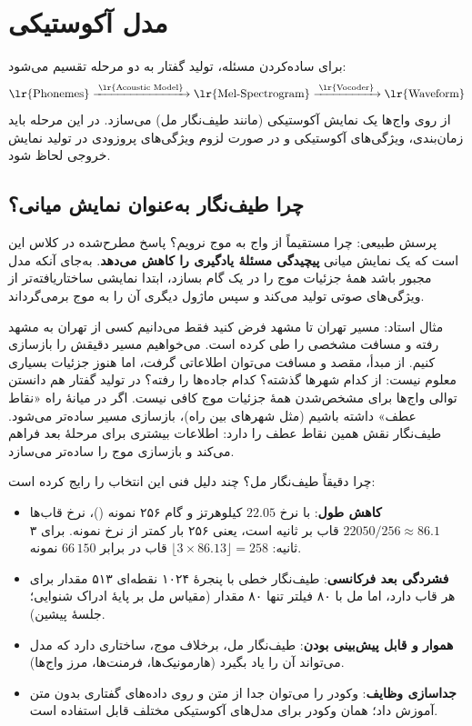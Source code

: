 \section{مدل آکوستیکی}

برای ساده‌کردن مسئله، تولید گفتار به دو مرحله تقسیم می‌شود:
\[
\text{\lr{Phonemes}} \xrightarrow{\;\text{\lr{Acoustic Model}}\;} \text{\lr{Mel-Spectrogram}} \xrightarrow{\;\text{\lr{Vocoder}}\;} \text{\lr{Waveform}}
\]
 از روی واج‌ها یک نمایش آکوستیکی (مانند طیف‌نگار مل) می‌سازد. در این مرحله باید زمان‌بندی، ویژگی‌های آکوستیکی و در صورت لزوم ویژگی‌های پروزودی در تولید نمایش خروجی لحاظ شود.

\subsection{چرا طیف‌نگار به‌عنوان نمایش میانی؟}
پرسش طبیعی: چرا مستقیماً از واج به موج نرویم؟ پاسخ مطرح‌شده در کلاس این است که یک نمایش میانی \textbf{پیچیدگی مسئلهٔ یادگیری را کاهش می‌دهد}. به‌جای آنکه مدل مجبور باشد همهٔ جزئیات موج را در یک گام بسازد، ابتدا نمایشی ساختاریافته‌تر از ویژگی‌های صوتی تولید می‌کند و سپس ماژول دیگری آن را به موج برمی‌گرداند.

\begin{exambox}{مثال استاد: مسیر تهران تا مشهد}
فرض کنید فقط می‌دانیم کسی از تهران به مشهد رفته و مسافت مشخصی را طی کرده است. می‌خواهیم مسیر دقیقش را بازسازی کنیم. از مبدأ، مقصد و مسافت می‌توان اطلاعاتی گرفت، اما هنوز جزئیات بسیاری معلوم نیست: از کدام شهرها گذشته؟ کدام جاده‌ها را رفته؟ در تولید گفتار هم دانستن توالی واج‌ها برای مشخص‌شدن همهٔ جزئیات موج کافی نیست. اگر در میانهٔ راه «نقاط عطف» داشته باشیم (مثل شهرهای بین راه)، بازسازی مسیر ساده‌تر می‌شود. طیف‌نگار نقش همین نقاط عطف را دارد: اطلاعات بیشتری برای مرحلهٔ بعد فراهم می‌کند و بازسازی موج را ساده‌تر می‌سازد.
\end{exambox}

\begin{addedbox}{چرا دقیقاً طیف‌نگار مل؟}
چند دلیل فنی این انتخاب را رایج کرده است:
\begin{itemize}
  \item \textbf{کاهش طول}: با نرخ $22.05$ کیلوهرتز و گام ۲۵۶ نمونه ()، نرخ قاب‌ها $22050/256 \approx 86.1$ قاب بر ثانیه است، یعنی ۲۵۶ بار کمتر از نرخ نمونه. برای ۳ ثانیه: $\lfloor 3 \times 86.13 \rfloor = 258$ قاب در برابر $66\,150$ نمونه.
  \item \textbf{فشردگی بعد فرکانسی}: طیف‌نگار خطی با پنجرهٔ ۱۰۲۴ نقطه‌ای ۵۱۳ مقدار برای هر قاب دارد، اما مل با ۸۰ فیلتر تنها ۸۰ مقدار (مقیاس مل بر پایهٔ ادراک شنوایی؛ جلسهٔ پیشین).
  \item \textbf{هموار و قابل پیش‌بینی بودن}: طیف‌نگار مل، برخلاف موج، ساختاری دارد که مدل می‌تواند آن را یاد بگیرد (هارمونیک‌ها، فرمنت‌ها، مرز واج‌ها).
  \item \textbf{جداسازی وظایف}: وکودر را می‌توان جدا از متن و روی داده‌های گفتاری بدون متن آموزش داد؛ همان وکودر برای مدل‌های آکوستیکی مختلف قابل استفاده است.
\end{itemize}
\end{addedbox}

